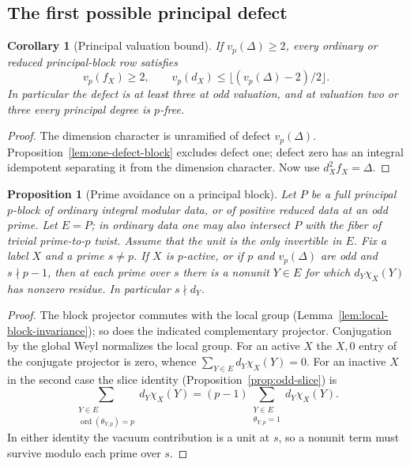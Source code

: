 \documentclass[11pt,a4paper]{article}
\numberwithin{equation}{section}
\newtheorem{proposition}[theorem]{Proposition}
\newtheorem{corollary}[theorem]{Corollary}
\theoremstyle{remark}
\DeclareMathOperator{\ord}{ord}
\begin{document}
\subsection{The first possible principal defect}\label{fam:M:sec:4.1}
\begin{corollary}[Principal valuation bound]\label{fam:M:4.1}
\label{cor:principal-valuation-bound}\label{cor:principal-cubic}
If $v_p(\Delta)\ge2$, every ordinary or reduced principal-block row
satisfies
\[
  v_p(f_X)\ge2,\qquad
  v_p(d_X)\le\lfloor(v_p(\Delta)-2)/2\rfloor .
\]
In particular the defect is at least three at odd valuation, and
at valuation two or three every principal degree is $p$-free.
\end{corollary}
\begin{proof}
The dimension character is unramified of defect $v_p(\Delta)$.
Proposition~\ref{lem:one-defect-block} excludes defect one; defect zero has
an integral idempotent separating it from the dimension character.
Now use $d_X^2f_X=\Delta$.
\end{proof}

\begin{proposition}[Prime avoidance on a principal block]\label{fam:M:4.2}
\label{prop:principal-support}\label{prop:principal-common-divisor}
Let $P$ be a full principal $p$-block of ordinary integral modular data,
or of positive reduced data at an odd prime. Let $E=P$; in ordinary
data one may also intersect $P$ with the fiber of trivial
prime-to-$p$ twist. Assume that the unit is the only invertible in
$E$. Fix a label $X$ and a prime $s\ne p$. If $X$ is $p$-active,
or if $p$ and $v_p(\Delta)$ are odd and $s\nmid p-1$, then at each
prime over $s$ there is a nonunit $Y\in E$ for which
$d_Y\chi_X(Y)$ has nonzero residue. In particular $s\nmid d_Y$.
\end{proposition}
\begin{proof}
The block projector commutes with the local group
(Lemma~\ref{lem:local-block-invariance}); so does the indicated
complementary projector. Conjugation by the global Weyl normalizes
the local group. For an active $X$ the $X,0$ entry of the conjugate
projector is zero, whence $\sum_{Y\in E}d_Y\chi_X(Y)=0$.
For an inactive $X$ in the second case the slice identity
(Proposition~\ref{prop:odd-slice}) is
\[
 \sum_{\substack{Y\in E\\\ord(\theta_{Y,p})=p}}d_Y\chi_X(Y)
 =(p-1)\sum_{\substack{Y\in E\\\theta_{Y,p}=1}}d_Y\chi_X(Y).
\]
In either identity the vacuum contribution is a unit at $s$, so a
nonunit term must survive modulo each prime over $s$.
\end{proof}
\end{document}
